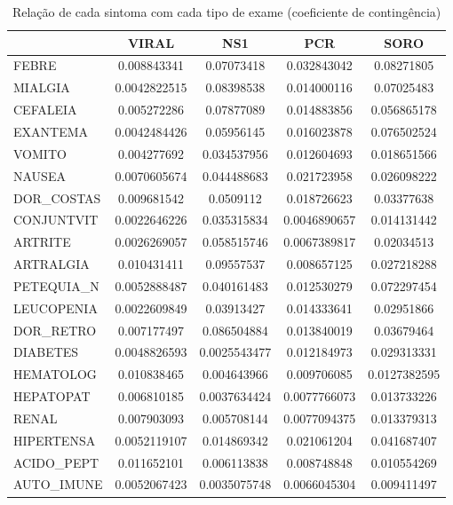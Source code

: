 \documentclass[a4paper,12pt]{article}
\begin{document}
\begin{table}[H]
    \centering
    \caption{Relação de cada sintoma com cada tipo de exame (coeficiente de contingência)}
    \begin{tabular}{lcccc}
        \toprule
        & VIRAL & NS1 & PCR & SORO \\ \midrule
        FEBRE & 0.008843341 & 0.07073418 & 0.032843042 & 0.08271805 \\
        MIALGIA & 0.0042822515 & 0.08398538 & 0.014000116 & 0.07025483 \\
        CEFALEIA & 0.005272286 & 0.07877089 & 0.014883856 & 0.056865178 \\
        EXANTEMA & 0.0042484426 & 0.05956145 & 0.016023878 & 0.076502524 \\
        VOMITO & 0.004277692 & 0.034537956 & 0.012604693 & 0.018651566 \\
        NAUSEA & 0.0070605674 & 0.044488683 & 0.021723958 & 0.026098222 \\
        DOR\_COSTAS & 0.009681542 & 0.0509112 & 0.018726623 & 0.03377638 \\
        CONJUNTVIT & 0.0022646226 & 0.035315834 & 0.0046890657 & 0.014131442 \\
        ARTRITE & 0.0026269057 & 0.058515746 & 0.0067389817 & 0.02034513 \\
        ARTRALGIA & 0.010431411 & 0.09557537 & 0.008657125 & 0.027218288 \\
        PETEQUIA\_N & 0.0052888487 & 0.040161483 & 0.012530279 & 0.072297454 \\
        LEUCOPENIA & 0.0022609849 & 0.03913427 & 0.014333641 & 0.02951866 \\
        DOR\_RETRO & 0.007177497 & 0.086504884 & 0.013840019 & 0.03679464 \\
        DIABETES & 0.0048826593 & 0.0025543477 & 0.012184973 & 0.029313331 \\
        HEMATOLOG & 0.010838465 & 0.004643966 & 0.009706085 & 0.0127382595 \\
        HEPATOPAT & 0.006810185 & 0.0037634424 & 0.0077766073 & 0.013733226 \\
        RENAL & 0.007903093 & 0.005708144 & 0.0077094375 & 0.013379313 \\
        HIPERTENSA & 0.0052119107 & 0.014869342 & 0.021061204 & 0.041687407 \\
        ACIDO\_PEPT & 0.011652101 & 0.006113838 & 0.008748848 & 0.010554269 \\
        AUTO\_IMUNE & 0.0052067423 & 0.0035075748 & 0.0066045304 & 0.009411497 \\
        \bottomrule
    \end{tabular}
    \label{tab:sintomas_resultados}
\end{table}
\end{document}
